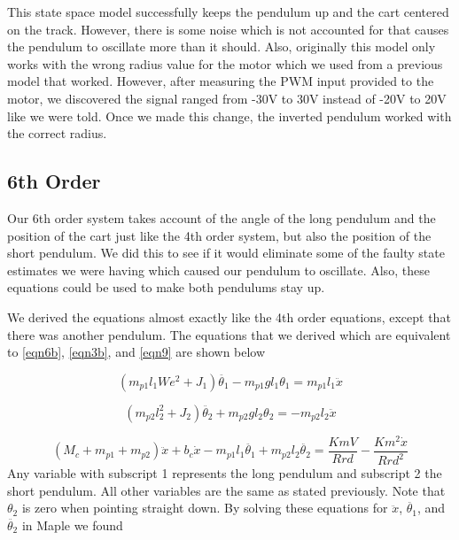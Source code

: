 \documentclass{article}
\begin{document}
This state space model successfully keeps the pendulum up and the cart centered on the track. However, there is some noise which is not accounted for that causes the pendulum to oscillate more than it should. Also, originally this model only works with the wrong radius value for the motor which we used from a previous model that worked. However, after measuring the PWM input provided to the motor, we discovered the signal ranged from -30V to 30V instead of -20V to 20V like we were told. Once we made this change, the inverted pendulum worked with the correct radius.

\subsection{6th Order}
Our 6th order system takes account of the angle of the long pendulum and the position of the cart just like the 4th order system, but also the position of the short pendulum. We did this to see if it would eliminate some of the faulty state estimates we were having which caused our pendulum to oscillate. Also, these equations could be used to make both pendulums stay up.

We derived the equations almost exactly like the 4th order equations, except that there was another pendulum. The equations that we derived which are equivalent to \ref{eqn6b}, \ref{eqn3b}, and \ref{eqn9} are shown below

\begin{equation} 
\label{eqn6th1}
(m_{p1} l_1We^2+J_1) \ddot{\theta_1}-m_{p1} g l_1 \theta_1 = m_{p1} l_1 \ddot{x}
\end{equation}

\begin{equation} 
\label{eqn6th2}
(m_{p2} l_2^2+J_2) \ddot{\theta_2}+m_{p2} g l_2 \theta_2 = -m_{p2} l_2 \ddot{x}
\end{equation}

\begin{equation} 
\label{eqn6th3}
(M_c+m_{p1}+m_{p2}) \ddot{x}+b_c \dot{x}-m_{p1} l_1 \ddot{\theta_1}+m_{p2} l_2 \ddot{\theta_2} = \frac{Km V}{R r d}-\frac{Km^2 \dot{x}}{R r d^2}
\end{equation}
Any variable with subscript 1 represents the long pendulum and subscript 2 the short pendulum. All other variables are the same as stated previously. Note that $\theta_2$ is zero when pointing straight down. By solving these equations for $\ddot{x}$, $\ddot{\theta_1}$, and $\ddot{\theta_2}$ in Maple we found
\end{document}
